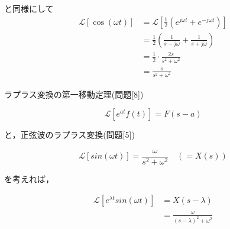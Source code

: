 \documentclass[a4paper,12pt]{article}
\begin{document}
\begin{tcolorbox}[title={[6] 余弦波関数 \( x(t) = \cos(\omega t) \) をラプラス変換せよ．}]

\quad [5]と同様にして
\vspace{-2mm}
\begin{align*}
\mathcal{L} \left[ \cos(\omega t) \right] &=
\mathcal{L} \left[ \frac{1}{2}\left( e^{j \omega t} + e^{-j \omega t} \right) \right] \\
&=\frac{1}{2} \left( \frac{1}{s-j \omega} + \frac{1}{s + j \omega} \right) \\
&=\frac{1}{2} \cdot \frac{2s}{s^2 + \omega^2} \\
&=\frac{s}{s^2 + \omega^2}
\end{align*}

\end{tcolorbox}
\begin{tcolorbox}[title={[7] \( e^{\lambda t} sin(\omega t) \) をラプラス変換せよ． }]

\quad ラプラス変換の第一移動定理(問題[8])

\[
    \mathcal{L} \left[ e^{at} f(t) \right] = F(s - a)
\]

と，正弦波のラプラス変換(問題[5])

\[
    \mathcal{L} \left[ sin(\omega t) \right] = \frac{\omega}{ s^2+ {\omega}^2} \quad \left( = X(s) \right)
\]

を考えれば，


\vspace{-3mm}
\begin{align*}
    \mathcal{L} \left[ e^{\lambda t} sin(\omega t) \right] &=
    X(s - \lambda) \\
    &=\frac{\omega}{ \left(s - \lambda \right)^2+ {\omega}^2}
\end{align*}

\vspace{2mm}
\vspace{2mm}
\end{tcolorbox}
\end{document}
